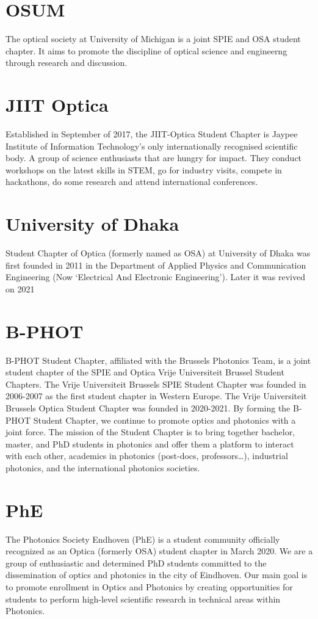 \documentclass[12pt, a4paper, twocolumn]{article}
\begin{document}
    \section{OSUM}
    The optical society at University of Michigan is a joint SPIE and OSA student chapter.
    It aims to promote the discipline of optical science and engineerng through research and discussion.

    \section{JIIT Optica}
    Established in September of 2017, the JIIT-Optica Student Chapter is Jaypee Institute of Information Technology’s only internationally recognised scientific body.
    A group of science enthusiasts that are hungry for impact.
    They conduct workshops on the latest skills in STEM, go for industry visits, compete in hackathons, do some research and attend international conferences.

    \section{University of Dhaka}
    Student Chapter of Optica (formerly named as OSA) at University of Dhaka was first founded in 2011 in the Department of Applied Physics and Communication Engineering (Now ‘Electrical And Electronic Engineering’). Later it was revived on 2021

    \section{B-PHOT}
    B-PHOT Student Chapter, affiliated with the Brussels Photonics Team, is a joint student chapter of the SPIE and Optica Vrije Universiteit Brussel Student Chapters. The Vrije Universiteit Brussels SPIE Student Chapter was founded in 2006-2007 as the first student chapter in Western Europe. The Vrije Universiteit Brussels Optica Student Chapter was founded in 2020-2021. By forming the B-PHOT Student Chapter, we continue to promote optics and photonics with a joint force. The mission of the Student Chapter is to bring together bachelor, master, and PhD students in photonics and offer them a platform to interact with each other, academics in photonics (post-docs, professors…), industrial photonics, and the international photonics societies.

    \section{PhE}
    The Photonics Society Endhoven (PhE) is a student community officially recognized as an Optica (formerly OSA) student chapter in March 2020.
    We are a group of enthusiastic and determined PhD students committed to the dissemination of optics and photonics in the city of Eindhoven.
    Our main goal is to promote enrollment in Optics and Photonics by creating opportunities for students to perform high-level scientific research in technical areas within Photonics.
\end{document}
